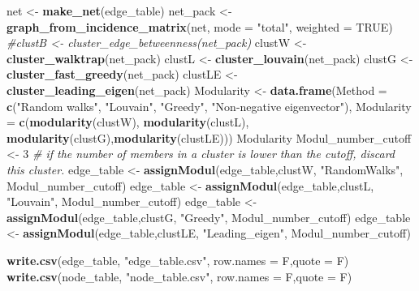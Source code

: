 \documentclass[
]{article}
\newenvironment{Shaded}{\begin{snugshade}}{\end{snugshade}}
\newcommand{\AttributeTok}[1]{\textcolor[rgb]{0.13,0.29,0.53}{#1}}
\newcommand{\CommentTok}[1]{\textcolor[rgb]{0.56,0.35,0.01}{\textit{#1}}}
\newcommand{\ConstantTok}[1]{\textcolor[rgb]{0.56,0.35,0.01}{#1}}
\newcommand{\DecValTok}[1]{\textcolor[rgb]{0.00,0.00,0.81}{#1}}
\newcommand{\FunctionTok}[1]{\textcolor[rgb]{0.13,0.29,0.53}{\textbf{#1}}}
\newcommand{\NormalTok}[1]{#1}
\newcommand{\OtherTok}[1]{\textcolor[rgb]{0.56,0.35,0.01}{#1}}
\newcommand{\StringTok}[1]{\textcolor[rgb]{0.31,0.60,0.02}{#1}}
\begin{document}
\begin{Shaded}
\begin{Highlighting}[]
\NormalTok{net }\OtherTok{\textless{}{-}} \FunctionTok{make\_net}\NormalTok{(edge\_table)}
\NormalTok{net\_pack }\OtherTok{\textless{}{-}} \FunctionTok{graph\_from\_incidence\_matrix}\NormalTok{(net, }\AttributeTok{mode =} \StringTok{"total"}\NormalTok{, }\AttributeTok{weighted =} \ConstantTok{TRUE}\NormalTok{)}
\CommentTok{\#clustB \textless{}{-} cluster\_edge\_betweenness(net\_pack)}
\NormalTok{clustW }\OtherTok{\textless{}{-}} \FunctionTok{cluster\_walktrap}\NormalTok{(net\_pack)}
\NormalTok{clustL }\OtherTok{\textless{}{-}} \FunctionTok{cluster\_louvain}\NormalTok{(net\_pack)}
\NormalTok{clustG }\OtherTok{\textless{}{-}} \FunctionTok{cluster\_fast\_greedy}\NormalTok{(net\_pack)}
\NormalTok{clustLE }\OtherTok{\textless{}{-}} \FunctionTok{cluster\_leading\_eigen}\NormalTok{(net\_pack)}
\NormalTok{Modularity }\OtherTok{\textless{}{-}} \FunctionTok{data.frame}\NormalTok{(}\AttributeTok{Method =} \FunctionTok{c}\NormalTok{(}\StringTok{"Random walks"}\NormalTok{, }\StringTok{"Louvain"}\NormalTok{, }\StringTok{"Greedy"}\NormalTok{, }\StringTok{"Non{-}negative eigenvector"}\NormalTok{),}
                         \AttributeTok{Modularity =} \FunctionTok{c}\NormalTok{(}\FunctionTok{modularity}\NormalTok{(clustW), }\FunctionTok{modularity}\NormalTok{(clustL),}
                                        \FunctionTok{modularity}\NormalTok{(clustG),}\FunctionTok{modularity}\NormalTok{(clustLE)))}
\NormalTok{Modularity}
\NormalTok{Modul\_number\_cutoff }\OtherTok{\textless{}{-}} \DecValTok{3}  \CommentTok{\# if the number of members in a cluster is lower than the cutoff, discard this cluster.}
\NormalTok{edge\_table }\OtherTok{\textless{}{-}} \FunctionTok{assignModul}\NormalTok{(edge\_table,clustW, }\StringTok{"RandomWalks"}\NormalTok{, Modul\_number\_cutoff)}
\NormalTok{edge\_table }\OtherTok{\textless{}{-}} \FunctionTok{assignModul}\NormalTok{(edge\_table,clustL, }\StringTok{"Louvain"}\NormalTok{, Modul\_number\_cutoff)}
\NormalTok{edge\_table }\OtherTok{\textless{}{-}} \FunctionTok{assignModul}\NormalTok{(edge\_table,clustG, }\StringTok{"Greedy"}\NormalTok{, Modul\_number\_cutoff)}
\NormalTok{edge\_table }\OtherTok{\textless{}{-}} \FunctionTok{assignModul}\NormalTok{(edge\_table,clustLE, }\StringTok{"Leading\_eigen"}\NormalTok{, Modul\_number\_cutoff)}

\FunctionTok{write.csv}\NormalTok{(edge\_table, }\StringTok{"edge\_table.csv"}\NormalTok{, }\AttributeTok{row.names =}\NormalTok{ F,}\AttributeTok{quote =}\NormalTok{ F)}
\FunctionTok{write.csv}\NormalTok{(node\_table, }\StringTok{"node\_table.csv"}\NormalTok{, }\AttributeTok{row.names =}\NormalTok{ F,}\AttributeTok{quote =}\NormalTok{ F)}
\end{Highlighting}
\end{Shaded}
\end{document}
